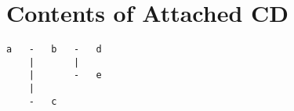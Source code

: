 \chapter{Contents of Attached CD}



\begin{lstlisting}[columns=fixed,basicstyle=\ttfamily\footnotesize,tabsize=4]
a   -   b   -   d
    |       |
    |       -   e
    |
    -   c
\end{lstlisting}
